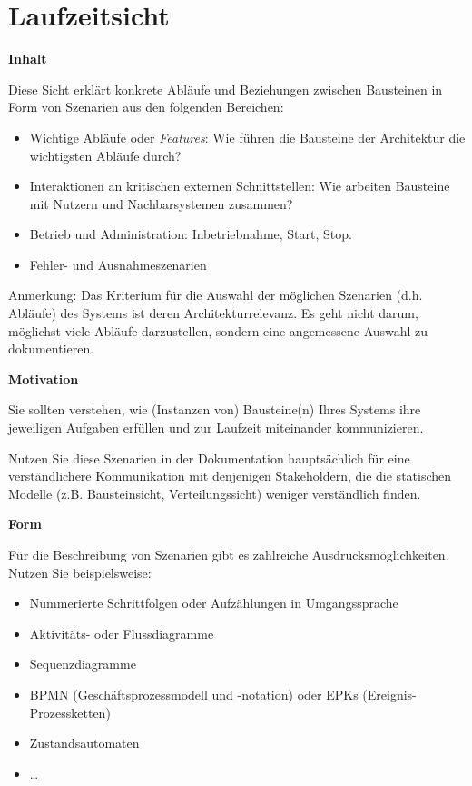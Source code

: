 \hypertarget{laufzeitsicht}{%
\section{Laufzeitsicht}\label{laufzeitsicht}}

\textbf{Inhalt}

Diese Sicht erklärt konkrete Abläufe und Beziehungen zwischen Bausteinen
in Form von Szenarien aus den folgenden Bereichen:

\begin{itemize}
\tightlist
\item
  Wichtige Abläufe oder \emph{Features}: Wie führen die Bausteine der
  Architektur die wichtigsten Abläufe durch?
\item
  Interaktionen an kritischen externen Schnittstellen: Wie arbeiten
  Bausteine mit Nutzern und Nachbarsystemen zusammen?
\item
  Betrieb und Administration: Inbetriebnahme, Start, Stop.
\item
  Fehler- und Ausnahmeszenarien
\end{itemize}

Anmerkung: Das Kriterium für die Auswahl der möglichen Szenarien (d.h.
Abläufe) des Systems ist deren Architekturrelevanz. Es geht nicht darum,
möglichst viele Abläufe darzustellen, sondern eine angemessene Auswahl
zu dokumentieren.

\textbf{Motivation}

Sie sollten verstehen, wie (Instanzen von) Bausteine(n) Ihres Systems
ihre jeweiligen Aufgaben erfüllen und zur Laufzeit miteinander
kommunizieren.

Nutzen Sie diese Szenarien in der Dokumentation hauptsächlich für eine
verständlichere Kommunikation mit denjenigen Stakeholdern, die die
statischen Modelle (z.B. Bausteinsicht, Verteilungssicht) weniger
verständlich finden.

\textbf{Form}

Für die Beschreibung von Szenarien gibt es zahlreiche
Ausdrucksmöglichkeiten. Nutzen Sie beispielsweise:

\begin{itemize}
\tightlist
\item
  Nummerierte Schrittfolgen oder Aufzählungen in Umgangssprache
\item
  Aktivitäts- oder Flussdiagramme
\item
  Sequenzdiagramme
\item
  BPMN (Geschäftsprozessmodell und -notation) oder EPKs
  (Ereignis-Prozessketten)
\item
  Zustandsautomaten
\item
  \ldots{}
\end{itemize}

